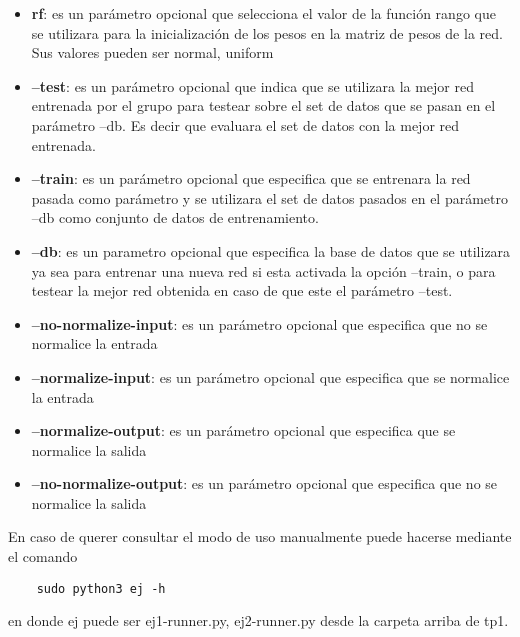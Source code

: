 \begin{itemize}
  \item \textbf{rf}: es un parámetro opcional que selecciona el valor de la función rango que se utilizara para la inicialización de los pesos en la matriz de pesos de la red.
            Sus valores pueden ser {normal, uniform}
  \item \textbf{--test}: es un parámetro opcional que indica que se utilizara la mejor red entrenada por el grupo para testear sobre el set de datos que se pasan en el parámetro
                        --db. Es decir que evaluara el set de datos con la mejor red entrenada.
  \item \textbf{--train}: es un parámetro opcional que especifica que se entrenara la red pasada como parámetro y se utilizara el set de datos pasados en el parámetro --db
                        como conjunto de datos de entrenamiento.
  \item \textbf{--db}: es un parametro opcional que especifica la base de datos que se utilizara ya sea para entrenar una nueva red si esta activada la opción --train, o
                        para testear la mejor red obtenida en caso de que este el parámetro --test.
  \item \textbf{--no-normalize-input}: es un parámetro opcional que especifica que no se normalice la entrada
  \item \textbf{--normalize-input}: es un parámetro opcional que especifica que se normalice la entrada
  \item \textbf{--normalize-output}: es un parámetro opcional que especifica que se normalice la salida
  \item \textbf{--no-normalize-output}: es un parámetro opcional que especifica que no se normalice la salida
\end{itemize}

En caso de querer consultar el modo de uso manualmente puede hacerse mediante el comando
\begin{verbatim}
    sudo python3 ej -h
\end{verbatim}
en donde ej puede ser {ej1-runner.py, ej2-runner.py} desde la carpeta arriba de tp1.

\newpage

